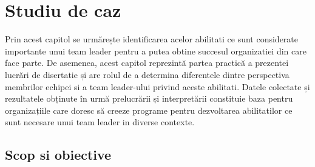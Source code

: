 \documentclass[a4paper, 12pt]{article}
\begin{document}
\setcounter{section}{2}
	\section{Studiu de caz }

	\quad\quad Prin acest capitol se urmărește identificarea acelor abilitati ce sunt  considerate importante unui team leader pentru a putea obtine succesul organizatiei din care face parte. De asemenea, acest capitol reprezintă partea practică a prezentei lucrări de disertatie și are rolul de a determina diferentele dintre perspectiva membrilor echipei si a team leader-ului privind  aceste abilitati. Datele colectate și rezultatele obținute în urmă prelucrării și interpretării constituie baza pentru organizațiile care doresc să creeze programe pentru dezvoltarea abilitatilor ce sunt necesare unui team leader in diverse contexte.

	\subsection{Scop si obiective}
	\quad%
	
\end{document}
